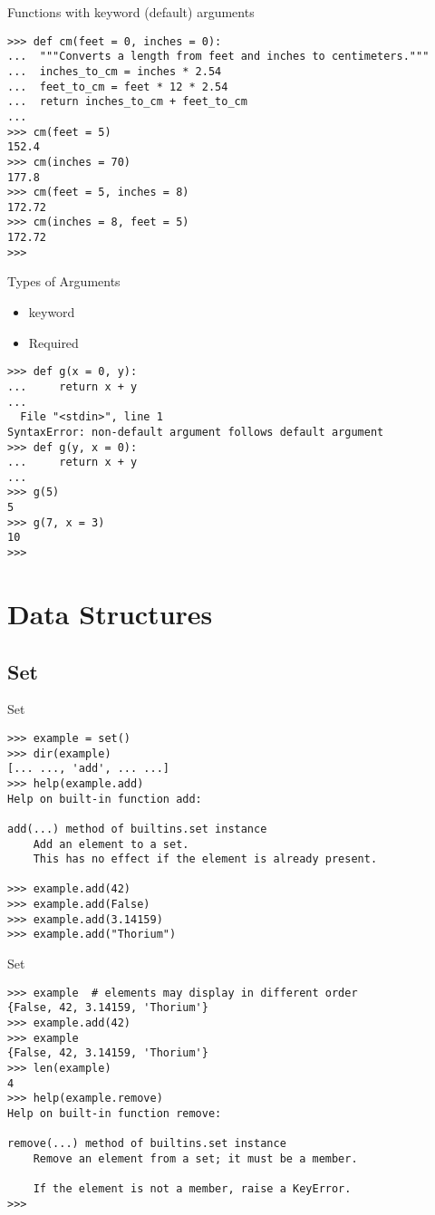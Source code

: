 \documentclass{beamer}
\begin{document}
\begin{frame}[fragile]{Functions with keyword (default) arguments}
\begin{verbatim}
>>> def cm(feet = 0, inches = 0):
...  """Converts a length from feet and inches to centimeters."""
...  inches_to_cm = inches * 2.54
...  feet_to_cm = feet * 12 * 2.54
...  return inches_to_cm + feet_to_cm
...
>>> cm(feet = 5)
152.4
>>> cm(inches = 70)
177.8
>>> cm(feet = 5, inches = 8)
172.72
>>> cm(inches = 8, feet = 5)
172.72
>>>
\end{verbatim}
\end{frame}

\begin{frame}[fragile]{Types of Arguments}
\begin{itemize}
  \item keyword
  \item Required
\end{itemize}
\begin{verbatim}
>>> def g(x = 0, y):
...     return x + y
...
  File "<stdin>", line 1
SyntaxError: non-default argument follows default argument
>>> def g(y, x = 0):
...     return x + y
...
>>> g(5)
5
>>> g(7, x = 3)
10
>>>
\end{verbatim}
\end{frame}

\section{Data Structures}
\subsection{Set}

\begin{frame}[fragile]{Set}
\begin{verbatim}
>>> example = set()
>>> dir(example)
[... ..., 'add', ... ...]
>>> help(example.add)
Help on built-in function add:

add(...) method of builtins.set instance
    Add an element to a set.
    This has no effect if the element is already present.

>>> example.add(42)
>>> example.add(False)
>>> example.add(3.14159)
>>> example.add("Thorium")
\end{verbatim}
\end{frame}

\begin{frame}[fragile]{Set}
\begin{verbatim}
>>> example  # elements may display in different order
{False, 42, 3.14159, 'Thorium'}
>>> example.add(42)
>>> example
{False, 42, 3.14159, 'Thorium'}
>>> len(example)
4
>>> help(example.remove)
Help on built-in function remove:

remove(...) method of builtins.set instance
    Remove an element from a set; it must be a member.

    If the element is not a member, raise a KeyError.
>>>
\end{verbatim}
\end{frame}
\end{document}
